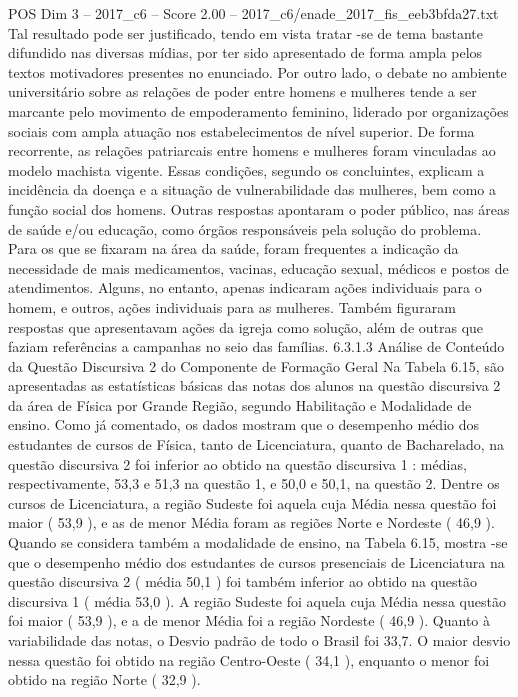 \begin{textsample}{POS Dim 3 – 2017\_c6 – Score 2.00 – 2017\_c6/enade\_2017\_fis\_eeb3bfda27.txt}
Tal resultado pode ser justificado, tendo em vista tratar -se de tema bastante difundido nas diversas mídias, por ter sido apresentado de forma ampla pelos textos motivadores presentes no enunciado.
Por outro lado, o debate no ambiente universitário sobre as relações de poder entre homens e mulheres tende a ser marcante pelo movimento de empoderamento feminino, liderado por organizações sociais com ampla atuação nos estabelecimentos de nível superior.
De forma recorrente, as relações patriarcais entre homens e mulheres foram vinculadas ao modelo machista vigente.
Essas condições, segundo os concluintes, explicam a incidência da doença e a situação de vulnerabilidade das mulheres, bem como a função social dos homens.
Outras respostas apontaram o poder público, nas áreas de saúde e/ou educação, como órgãos responsáveis pela solução do problema.
Para os que se fixaram na área da saúde, foram frequentes a indicação da necessidade de mais medicamentos, vacinas, educação sexual, médicos e postos de atendimentos.
Alguns, no entanto, apenas indicaram ações individuais para o homem, e outros, ações individuais para as mulheres.
Também figuraram respostas que apresentavam ações da igreja como solução, além de outras que faziam referências a campanhas no seio das famílias. 6.3.1.3 Análise de Conteúdo da Questão Discursiva 2 do Componente de Formação Geral Na Tabela 6.15, são apresentadas as estatísticas básicas das notas dos alunos na questão discursiva 2 da área de Física por Grande Região, segundo Habilitação e Modalidade de ensino.
Como já comentado, os dados mostram que o desempenho médio dos estudantes de cursos de Física, tanto de Licenciatura, quanto de Bacharelado, na questão discursiva 2 foi inferior ao obtido na questão discursiva 1 : médias, respectivamente, 53,3 e 51,3 na questão 1, e 50,0 e 50,1, na questão 2.
Dentre os cursos de Licenciatura, a região Sudeste foi aquela cuja Média nessa questão foi maior ( 53,9 ), e as de menor Média foram as regiões Norte e Nordeste ( 46,9 ).
Quando se considera também a modalidade de ensino, na Tabela 6.15, mostra -se que o desempenho médio dos estudantes de cursos presenciais de Licenciatura na questão discursiva 2 ( média 50,1 ) foi também inferior ao obtido na questão discursiva 1 ( média 53,0 ).
A região Sudeste foi aquela cuja Média nessa questão foi maior ( 53,9 ), e a de menor Média foi a região Nordeste ( 46,9 ).
Quanto à variabilidade das notas, o Desvio padrão de todo o Brasil foi 33,7.
O maior desvio nessa questão foi obtido na região Centro-Oeste ( 34,1 ), enquanto o menor foi obtido na região Norte ( 32,9 ).

\end{textsample}
